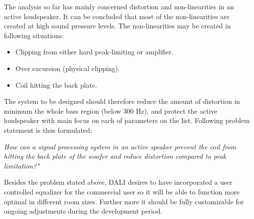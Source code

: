 The analysis so far has mainly concerned distortion and non-linearities in an active loudspeaker. It can be concluded that most of the non-linearities are created at high sound pressure levels. The non-linearities may be created in following situations:
\begin{itemize}
\item Clipping from either hard peak-limiting or amplifier.
\item Over excursion (physical clipping).
\item Coil hitting the back plate.
\end{itemize}

The system to be designed should therefore reduce the amount of distortion in minimum the whole bass region (below 300 Hz), and protect the active loudspeaker with main focus on each of parameters on the list. Following problem statement is thus formulated:


\begin{center}
\label{ProblemStatement}
\textit{How can a signal processing system in an active speaker prevent the coil from hitting the back plate of the woofer and reduce distortion compared to peak limitation?"}
\end{center}
Besides the problem stated above, DALI desires to have incorporated a user controlled equalizer for the commercial user so it will be able to function more optimal in different room sizes. Further more it should be fully customizable for ongoing adjustments during the development period.




